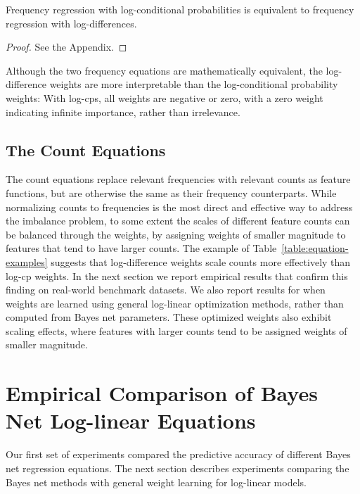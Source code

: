 \documentclass[twoside,11pt]{article}
\begin{document}
\begin{theorem} \label{prop:log-diff} Frequency regression with log-conditional probabilities is equivalent to frequency regression with log-differences.
\end{theorem}

\begin{proof} See the Appendix. %
\end{proof}


Although the two frequency equations are mathematically equivalent, the log-difference weights are more interpretable than the log-conditional probability weights: With log-cps, all weights are negative or zero, with a zero weight indicating infinite importance, rather than irrelevance.


\subsection{The Count Equations} \label{sec:countequations}


The count equations replace relevant frequencies with relevant counts as feature functions, but are otherwise the same as their frequency counterparts. While normalizing counts to frequencies is the most direct and effective way to address the imbalance problem, to some extent the scales of different feature counts can be balanced through the weights, by assigning weights of smaller magnitude to features that tend to have larger counts. The example of Table~\ref{table:equation-examples} suggests that log-difference weights scale counts more effectively than log-cp weights. In the next section we report empirical results that confirm this finding on real-world benchmark datasets. We also report results for when weights are learned using general log-linear optimization methods, rather than computed from Bayes net parameters. These optimized weights also exhibit scaling effects, where features with larger counts tend to be assigned weights of smaller magnitude.


%

\section{Empirical Comparison of Bayes Net Log-linear Equations}\label{sec:empirical-comparison}

Our first set of experiments compared the predictive accuracy of different Bayes net regression equations. The next section describes experiments comparing the Bayes net methods with general weight learning for log-linear models. 
\end{document}
